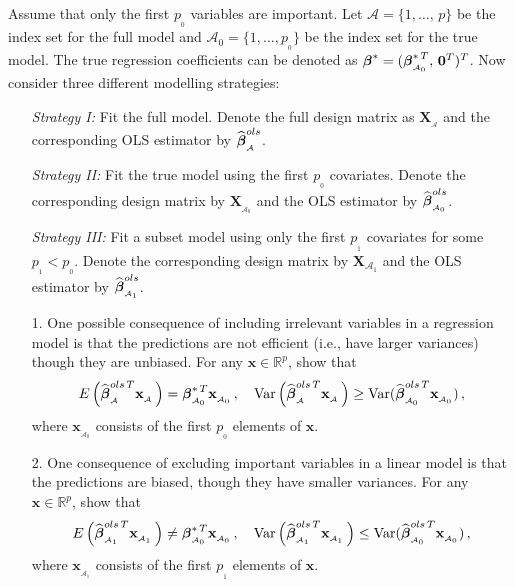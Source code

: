 \documentclass[11pt]{report}
\newcommand{\bfmath}[1]{\mbox{\boldmath$#1$\unboldmath}}
\begin{document}
\noindent
Assume that only the first $p_{_0}$ variables are important. Let $\mathcal{A} =\lbrace 1,\dots,\,p\rbrace$ be the index set for the full model and $\mathcal{A}_0=\lbrace 1,\dots, p_{_0}\rbrace$ be the index set for the true model. The
true regression coefficients can be denoted as $\bfmath{\beta}^\ast= (\bfmath{\beta}^{\ast\, T}_{_{\mathcal{A}_0}},\,\mathbf{0}^T)^T$. Now consider three
different modelling strategies: 
\begin{itemize}
\item[] {\it Strategy I:} Fit the full model. Denote the full design matrix as $\mathbf{X}_{_\mathcal{A}}$ and the corresponding OLS estimator by $\widehat{\bfmath{\beta}}^{ols}_{_\mathcal{A}}$. 
\item[] {\it Strategy II:} Fit the true model using the first $p_{_0}$ covariates. Denote the corresponding design matrix by $\mathbf{X}_{_{\mathcal{A}_0}}$ and the OLS estimator by $\widehat{\bfmath{\beta}}^{ols}_{_{\mathcal{A}_0}}$.
\item[] {\it Strategy III:} Fit a subset model using only the first $p_{_1}$ covariates for some $p_{_1}<p_{_0}$. Denote the corresponding design matrix by $\mathbf{X}_{\mathcal{A}_1}$ and the OLS estimator by $\widehat{\bfmath{\beta}}^{ols}_{_{\mathcal{A}_1}}$.  
\end{itemize}
\begin{enumerate}
\item[1. ] One possible consequence of including irrelevant variables in a regression model is that the predictions are not efficient (i.e., have larger variances) though they are unbiased. For any $\mathbf{x}\in\mathbb{R}^p$, show that
$$E\left( \widehat{\bfmath{\beta}}^{ols\,T}_{_\mathcal{A}}\mathbf{x}_{_\mathcal{A}}\,\right)=\bfmath{\beta}^{\ast\,T}_{_{\mathcal{A}_0}}\mathbf{x}_{_{\mathcal{A}_0}}\,,\quad \text{Var}\left( \widehat{\bfmath{\beta}}^{ols\,T}_{_\mathcal{A}}\mathbf{x}_{_\mathcal{A}}\,\right)\geq \text{Var}(\widehat{\bfmath{\beta}}^{ols\,T}_{_{\mathcal{A}_0}}\mathbf{x}_{_{\mathcal{A}_0}})\,,$$
where $\mathbf{x}_{_{\mathcal{A}_0}}$ consists of the first $p_{_0}$ elements of $\mathbf{x}$.   
\item[2. ] One consequence of excluding important variables in a linear model is that the predictions are biased, though they have smaller variances. For any $\mathbf{x}\in\mathbb{R}^p$, show that
$$E\left( \widehat{\bfmath{\beta}}^{ols\,T}_{_{\mathcal{A}_1}}\mathbf{x}_{_{\mathcal{A}_1}}\,\right)\neq\bfmath{\beta}^{\ast\,T}_{_{\mathcal{A}_0}}\mathbf{x}_{_{\mathcal{A}_0}}\,,\quad \text{Var}\left( \widehat{\bfmath{\beta}}^{ols\,T}_{_{\mathcal{A}_1}}\mathbf{x}_{_{\mathcal{A}_1}}\,\right)\leq \text{Var}(\widehat{\bfmath{\beta}}^{ols\,T}_{_{\mathcal{A}_0}}\mathbf{x}_{_{\mathcal{A}_0}})\,,$$
where $\mathbf{x}_{_{\mathcal{A}_1}}$ consists of the first $p_{_1}$ elements of $\mathbf{x}$.
\end{enumerate}
\noindent
\end{document}
